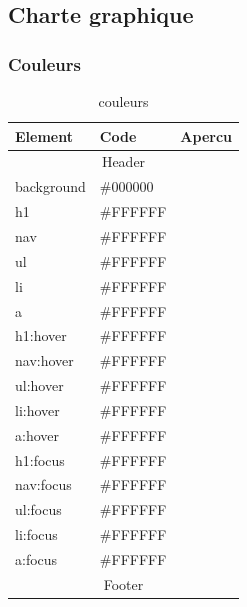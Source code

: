 \documentclass[letter, 11pt, draft]{report}
\begin{document}
\subsection{Charte graphique}


\subsubsection{Couleurs}

\begin{table}[h]
	\caption{couleurs}
	\begin{center}
		\begin{tabular}{|l|l|l|}
		\hline
		Element    					& Code     & Apercu \\ \hline
		\multicolumn{3}{|c|}{Header} \\ \hline
		background 					& \#000000 & \cellcolor[HTML]{000000} \\ \hline
		h1         					& \#FFFFFF & \cellcolor[HTML]{FFFFFF} \\ \hline
		nav        					& \#FFFFFF & \cellcolor[HTML]{FFFFFF} \\ \hline
		ul         					& \#FFFFFF & \cellcolor[HTML]{FFFFFF} \\ \hline
		li         					& \#FFFFFF & \cellcolor[HTML]{FFFFFF} \\ \hline
		a          					& \#FFFFFF & \cellcolor[HTML]{FFFFFF} \\ \hline
		h1:hover   					& \#FFFFFF & \cellcolor[HTML]{FFFFFF} \\ \hline
		nav:hover  					& \#FFFFFF & \cellcolor[HTML]{FFFFFF} \\ \hline
		ul:hover   					& \#FFFFFF & \cellcolor[HTML]{FFFFFF} \\ \hline
		li:hover   					& \#FFFFFF & \cellcolor[HTML]{FFFFFF} \\ \hline
		a:hover    					& \#FFFFFF & \cellcolor[HTML]{FFFFFF} \\ \hline
		h1:focus   					& \#FFFFFF & \cellcolor[HTML]{FFFFFF} \\ \hline
		nav:focus  					& \#FFFFFF & \cellcolor[HTML]{FFFFFF} \\ \hline
		ul:focus   					& \#FFFFFF & \cellcolor[HTML]{FFFFFF} \\ \hline
		li:focus   					& \#FFFFFF & \cellcolor[HTML]{FFFFFF} \\ \hline
		a:focus    					& \#FFFFFF & \cellcolor[HTML]{FFFFFF} \\ \hline
		\multicolumn{3}{|c|}{Footer} \\ \hline

\end{tabular}
\end{center}
\end{table}
\end{document}
